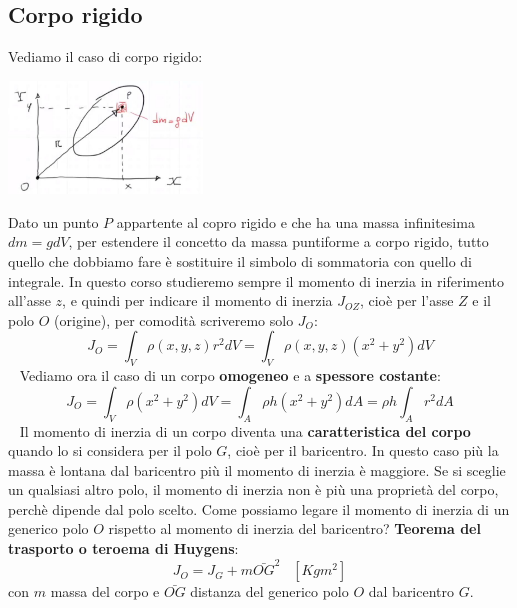 \subsection{Corpo rigido}
Vediamo il caso di corpo rigido:
\begin{center}
    \includegraphics[height=3cm]{../lezione8/img4.JPG}
\end{center}
Dato un punto $P$ appartente al copro rigido e che ha una massa infinitesima $dm = g dV$, per estendere il concetto da massa puntiforme a corpo rigido, tutto quello che dobbiamo fare è sostituire il simbolo di sommatoria con quello di integrale.\newline
\newline
In questo corso studieremo sempre il momento di inerzia in riferimento all'asse $z$, e quindi per indicare il momento di inerzia $J_{OZ}$, cioè per l'asse $Z$ e il polo $O$ (origine), per comodità scriveremo solo $J_O$:
\[
    J_{O} = \int_V \rho(x,y,z) r^2 dV = \int_V \rho(x,y,z) (x^2+y^2) dV
\]
\ \newline
Vediamo ora il caso di un corpo \textbf{omogeneo} e a \textbf{spessore costante}:
\[
    J_O = \int_V \rho(x^2+y^2) dV = \int_A \rho h(x^2 + y^2) dA = \rho h \int_A r^2 dA
\]
\ \newline
Il momento di inerzia di un corpo diventa una \textbf{caratteristica del corpo} quando lo si considera per il polo $G$, cioè per il baricentro. In questo caso più la massa è lontana dal baricentro più il momento di inerzia è maggiore.\newline
Se si sceglie un qualsiasi altro polo, il momento di inerzia non è più una proprietà del corpo, perchè dipende dal polo scelto.\newline
\newline
Come possiamo legare il momento di inerzia di un generico polo $O$ rispetto al momento di inerzia del baricentro?\newline
\textbf{Teorema del trasporto o teroema di Huygens}:
\[
    J_O = J_G + m \bar{OG}^2 \;\;\;[Kg m^2]
\]
con $m$ massa del corpo e $\bar{OG}$ distanza del generico polo $O$ dal baricentro $G$.
\newline
